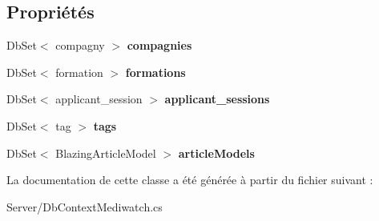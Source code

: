 \subsection*{Propriétés}
\begin{DoxyCompactItemize}
\item 
\mbox{\label{class_server_1_1_db_context_mediwatch_a068d9222b8448c069c2d181a9f577d0c}} 
Db\+Set$<$ compagny $>$ {\bfseries compagnies}
\item 
\mbox{\label{class_server_1_1_db_context_mediwatch_a6597dab2848cd5aa87774af4bf6eb4e4}} 
Db\+Set$<$ formation $>$ {\bfseries formations}
\item 
\mbox{\label{class_server_1_1_db_context_mediwatch_aea8aaf9d1c1f27f64a2a488f41c531b2}} 
Db\+Set$<$ applicant\+\_\+session $>$ {\bfseries applicant\+\_\+sessions}
\item 
\mbox{\label{class_server_1_1_db_context_mediwatch_a0bcaba8827c3d82857deb35923f6dcef}} 
Db\+Set$<$ tag $>$ {\bfseries tags}
\item 
\mbox{\label{class_server_1_1_db_context_mediwatch_a298accc740bb1638718fe4664b41e800}} 
Db\+Set$<$ Blazing\+Article\+Model $>$ {\bfseries article\+Models}
\end{DoxyCompactItemize}


La documentation de cette classe a été générée à partir du fichier suivant \+:\begin{DoxyCompactItemize}
\item 
Server/Db\+Context\+Mediwatch.\+cs\end{DoxyCompactItemize}
